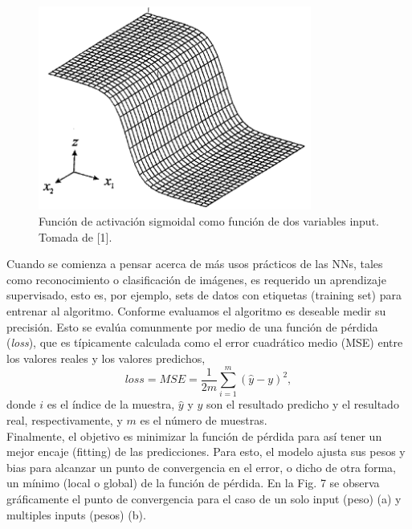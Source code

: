 \documentclass{article}
\begin{document}
\begin{figure}[th!]
   \includegraphics[width=0.8\textwidth]{sigm.png}
   \caption{Función de activación sigmoidal como función de dos variables input. Tomada de [1].}
\end{figure}

Cuando se comienza a pensar acerca de más usos prácticos de las NNs, tales como reconocimiento o clasificación de imágenes, es requerido un aprendizaje supervisado, esto es, por ejemplo, sets de datos con etiquetas (training set) para entrenar al algoritmo. Conforme evaluamos el algoritmo es deseable medir su precisión. Esto se evalúa comunmente por medio de una función de pérdida (\textit{loss}), que es típicamente calculada como el error cuadrático medio (MSE) entre los valores reales y los valores predichos,
\begin{equation}
    loss=MSE= \frac{1}{2m} \sum_{i=1}^m (\hat{y}-y)^2,
\end{equation}
donde $i$ es el índice de la muestra, $\hat{y}$ y $y$ son el resultado predicho y el resultado real, respectivamente, y $m$ es el número de muestras.\\

Finalmente, el objetivo es minimizar la función de pérdida para así tener un mejor encaje (fitting) de las predicciones. Para esto, el modelo ajusta sus pesos y bias para alcanzar un punto de convergencia en el error, o dicho de otra forma, un mínimo (local o global) de la función de pérdida. En la Fig. 7 se observa gráficamente el punto de convergencia para el caso de un solo input (peso) (a) y multiples inputs (pesos) (b).\\
\end{document}
